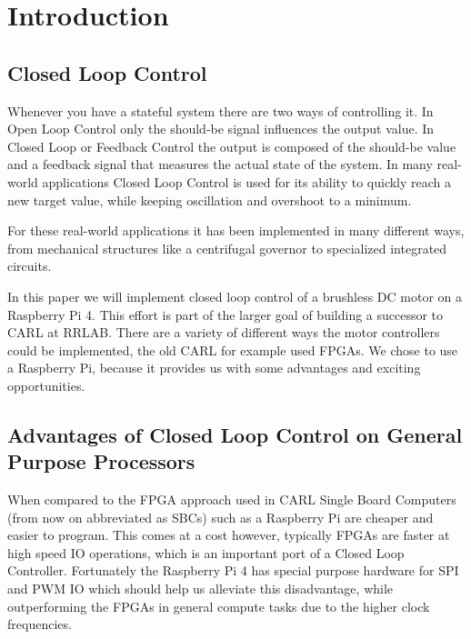 \chapter{Introduction}
\label{chap:introduction}

\begin{comment}
Rust as new language competitive to C?
Bare-metal still necessary with modern Microprocessors and Real-time Linux?
What if we want to implement something different from linear control?
\end{comment}

\section{Closed Loop Control}
\label{sec:introduction:clc}

Whenever you have a stateful system there are two ways of controlling it.
In Open Loop Control only the should-be signal influences the output value.
In Closed Loop or Feedback Control the output is composed of the should-be value and a feedback signal that measures the actual state of the system.
In many real-world applications Closed Loop Control is used for its ability to quickly reach a new target value, while keeping oscillation and overshoot to a minimum.

For these real-world applications it has been implemented in many different ways,
from mechanical structures like a centrifugal governor to specialized integrated circuits.

In this paper we will implement closed loop control of a brushless DC motor on a Raspberry Pi 4.
This effort is part of the larger goal of building a successor to CARL \cite{CARL} at RRLAB.
There are a variety of different ways the motor controllers could be implemented, the old CARL for example used FPGAs.
We chose to use a Raspberry Pi, because it provides us with some advantages and exciting opportunities.

\section{Advantages of Closed Loop Control on General Purpose Processors}
\label{sec:introduction:gpp}

When compared to the FPGA approach used in CARL Single Board Computers (from now on abbreviated as SBCs) such as a Raspberry Pi are cheaper and easier to program.
This comes at a cost however, typically FPGAs are faster at high speed IO operations, which is an important port of a Closed Loop Controller.
Fortunately the Raspberry Pi 4 has special purpose hardware for SPI and PWM IO which should help us alleviate this disadvantage,
while outperforming the FPGAs in general compute tasks due to the higher clock frequencies.

